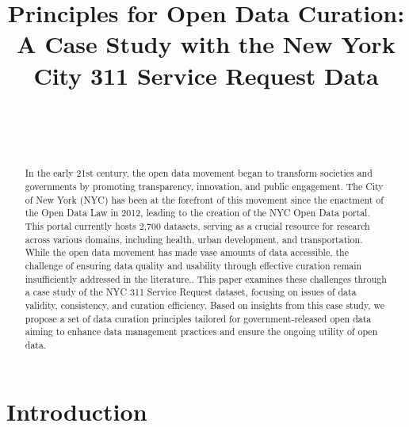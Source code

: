 \documentclass[linenumber]{jdsart}
\begin{document}



\begin{frontmatter}
  
\title{Principles for Open Data Curation: A Case Study with the New
York City 311 Service Request Data}

\author[1]{~}
\author[2]{~}
\address[1]{, }
\address[2]{Department of Statistics,
  , }



\begin{abstract}
In the early 21st century, the open data movement began to transform 
societies and governments by promoting transparency,
innovation, and public engagement. The City of New York (NYC) has been at
the forefront of this movement since the enactment of the Open 
Data Law in 2012, leading to the creation of the NYC Open Data
portal. This portal currently hosts 2,700 datasets,
serving as a crucial resource for research across various domains, 
including health, urban development, and transportation. While the
open data movement has made vase amounts of data accessible, the
challenge of ensuring data quality and usability through effective
curation remain insufficiently addressed in the literature..
This paper examines these challenges through a
case study of the NYC 311 Service Request dataset, focusing on issues 
of data validity, consistency, and curation efficiency. Based on 
insights from this case study, we propose a set of data curation 
principles tailored for government-released open data aiming
to enhance data management practices and ensure 
the ongoing utility of open data.
\end{abstract}

\begin{keywords} %
\end{keywords}

\end{frontmatter}

\section{Introduction} 
\label{sec:intro}
\end{document}
